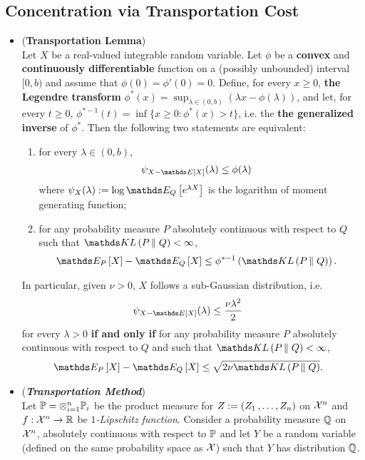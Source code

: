 \documentclass[11pt]{article}
\begin{document}
\subsection{Concentration via Transportation Cost}
\begin{itemize}
\item \begin{lemma} (\textbf{Transportation Lemma}) \citep{boucheron2013concentration}\\
Let $X$ be a real-valued integrable random variable. Let $\phi$ be a \textbf{convex} and \textbf{continuously differentiable} function on a (possibly unbounded) interval $[0, b)$ and assume that $\phi(0) = \phi'(0) = 0$. Define, for every $x \ge 0$, \textbf{the Legendre transform} $\phi^{*}(x) = \sup_{\lambda \in (0,b)}(\lambda x - \phi(\lambda))$, and let, for every $t \ge 0$, $\phi^{*-1}(t) = \inf\{x \ge 0: \phi^{*}(x) > t\}$, i.e. the \textbf{the generalized inverse} of $\phi^{*}$. Then the following two statements are equivalent:
\begin{enumerate}
\item for every $\lambda \in (0,b)$,
\begin{align*}
\psi_{X - \E{}{X}}(\lambda) &\le \phi(\lambda)
\end{align*} where $\psi_{X}(\lambda):= \log\E{Q}{e^{\lambda X}}$ is the logarithm of moment generating function;
\item for any probability measure $P$ absolutely continuous with respect to $Q$ such that $\kl{P}{Q} < \infty$,
\begin{align}
\E{P}{X} - \E{Q}{X} &\le \phi^{*-1}\paren{\kl{P}{Q}}. \label{ineqn: information_inequality_general}
\end{align} 
\end{enumerate}
In particular, given $\nu > 0$, $X$ follows a sub-Gaussian distribution, i.e.
\begin{align*}
\psi_{X - \E{}{X}}(\lambda) &\le \frac{\nu\lambda^2}{2}
\end{align*} for every $\lambda >0$ \textbf{if and only if} for any probability measure $P$ absolutely continuous with respect to $Q$ and such that $\kl{P}{Q} < \infty$, 
\begin{align}
\E{P}{X} - \E{Q}{X} &\le \sqrt{2\nu\kl{P}{Q}}. \label{ineqn: information_inequality_sub_gaussian}
\end{align}
\end{lemma}

\item \begin{remark} (\textbf{\emph{Transportation Method}})\\ 
Let ${\mathbb P} = \otimes_{i=1}^{n}{\mathbb P}_i$ be the product measure for $Z := (Z_1 \,{,}\ldots{,}\, Z_n)$ on ${\mathcal X}^n$ and $f: {\mathcal X}^n  \to {\mathbb R}$ be \emph{$1$-Lipschitz function}.  Consider a probability measure ${\mathbb Q}$ on ${\mathcal X}^n$, absolutely continuous with respect to ${\mathbb P}$ and let $Y$ be a random variable (defined on the same probability space as ${\mathcal X}$) such that $Y$ has distribution ${\mathbb Q}$.


\end{remark}
\end{itemize}
\end{document}
